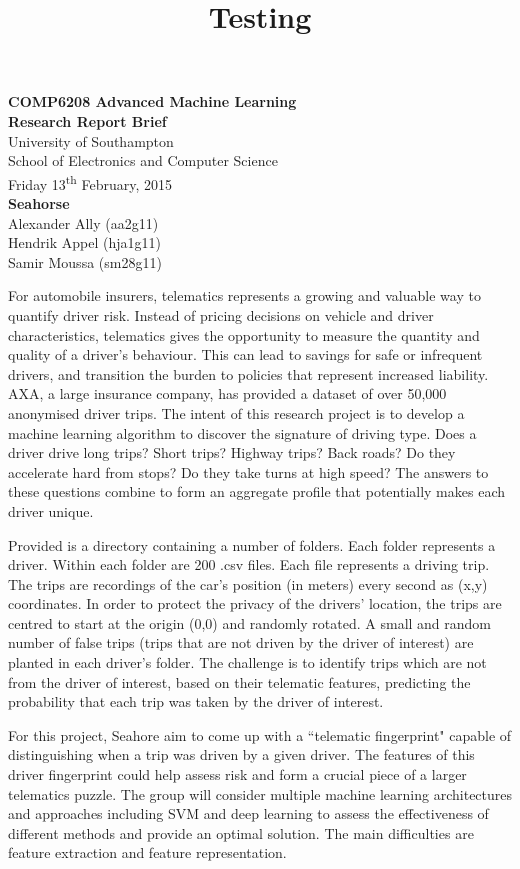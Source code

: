 \documentclass[11pt, a4paper, titlepage]{article}
\title{Testing}
\begin{document}
\begin{center}
{\Large \textbf{COMP6208 Advanced Machine Learning\\Research Report Brief}}\\
\vspace{0.7cm}
University of Southampton\\
School of Electronics and Computer Science\\
Friday 13\textsuperscript{th} February, 2015\\
\vspace{0.7cm}
\textbf{{\large Seahorse}}\\
Alexander Ally (aa2g11)\\
Hendrik Appel (hja1g11)\\
Samir Moussa (sm28g11)
\end{center}

For automobile insurers, telematics represents a growing and valuable way to quantify driver risk. Instead of pricing decisions on vehicle and driver characteristics, telematics gives the opportunity to measure the quantity and quality of a driver's behaviour. This can lead to savings for safe or infrequent drivers, and transition the burden to policies that represent increased liability. AXA, a large insurance company, has provided a dataset of over 50,000 anonymised driver trips. The intent of this research project is to develop a machine learning algorithm to discover the signature of driving type. Does a driver drive long trips? Short trips? Highway trips? Back roads? Do they accelerate hard from stops? Do they take turns at high speed? The answers to these questions combine to form an aggregate profile that potentially makes each driver unique.

Provided is a directory containing a number of folders. Each folder represents a driver. Within each folder are 200 .csv files. Each file represents a driving trip. The trips are recordings of the car's position (in meters) every second as (x,y) coordinates. In order to protect the privacy of the drivers' location, the trips are centred to start at the origin (0,0) and randomly rotated. A small and random number of false trips (trips that are not driven by the driver of interest) are planted in each driver's folder. The challenge is to identify trips which are not from the driver of interest, based on their telematic features, predicting the probability that each trip was taken by the driver of interest.

For this project, Seahore aim to come up with a ``telematic fingerprint" capable of distinguishing when a trip was driven by a given driver. The features of this driver fingerprint could help assess risk and form a crucial piece of a larger telematics puzzle. The group will consider multiple machine learning architectures and approaches including SVM and deep learning to assess the effectiveness of different methods and provide an optimal solution. The main difficulties are feature extraction and feature representation.
\end{document}
